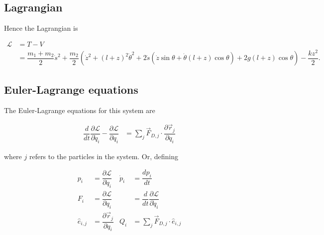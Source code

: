 \documentclass[12pt,a4paper,portrait]{article}
\newcommand{\lag}{\mathcal{L}}
\begin{document}
\subsection{Lagrangian}
Hence the Lagrangian is

\begin{align*}
	\lag &= T - V \\
	&= \dfrac{m_1+m_2}{2} \dot{s}^2 + \dfrac{m_2}{2}\left(\dot{z}^2 + (l+z)^2\dot{\theta}^2 + 2\dot{s}(\dot{z}\sin{\theta} + \dot{\theta}(l+z)\cos{\theta})+2g(l+z)\cos{\theta}\right) - \dfrac{kz^2}{2}.
\end{align*}

\subsection{Euler-Lagrange equations}
The Euler-Lagrange equations for this system are

\begin{align*}
	\dfrac{d}{dt}\dfrac{\partial \lag}{\partial \dot{q}_i} - \dfrac{\partial \lag}{\partial q_i} &= \sum_{j} \vec{F}_{D, j} \cdot \dfrac{\partial \vec{r}_{j}}{\partial q_i}
\end{align*}

where $j$ refers to the particles in the system. Or, defining

\begin{align*}
	p_i &= \dfrac{\partial \lag}{\partial \dot{q}_i} & \dot{p}_i &= \dfrac{dp_i}{dt} \\
	F_i &= \dfrac{\partial \lag}{\partial q_i} & &= \dfrac{d}{dt}\dfrac{\partial \lag}{\partial \dot{q}_i}\\
	\hat{e}_{i,j} &= \dfrac{\partial \vec{r}_{j}}{\partial q_i} & Q_i &= \sum_{j} \vec{F}_{D, j} \cdot \hat{e}_{i,j}
\end{align*}
\end{document}
